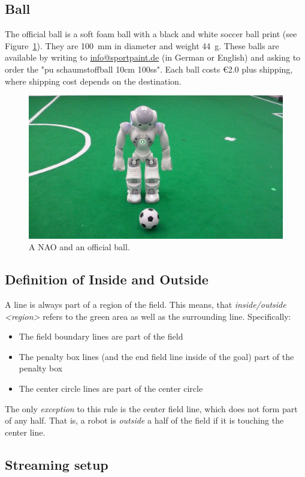 \subsection{Ball}
\label{sec:ball}

The official ball is a soft foam ball with a black and white soccer ball print (see Figure~\ref{fig:ball}). They are \qty{100}{\milli\metre} in diameter and weight \qty{44}{\gram}. These balls are available by writing to \url{info@sportpaint.de} (in German or English) and asking to order the "pu schaumstoffball 10cm 100ss".  Each ball costs \euro{2.0} plus shipping, where shipping cost depends on the destination.

\begin{figure}[t]
  \centerline{\includegraphics[height=0.28\columnwidth]{figs/robotWithBall2016.jpg}}
  \caption{A NAO and an official ball.}
  \label{fig:ball}
\end{figure}

\subsection{Definition of Inside and Outside}
\label{sec:inside_outside}

A line is always part of a region of the field.
This means, that \emph{inside/outside \textless region\textgreater} refers to the green area as well as the surrounding line.
Specifically:
\begin{itemize}
    \item The field boundary lines are part of the field
    \item The penalty box lines (and the end field line inside of the goal) part of the penalty box
    \item The center circle lines are part of the center circle
\end{itemize}

The only \textit{exception} to this rule is the center field line, which does not form part of any half.
That is, a robot is \textit{outside} a half of the field if it is touching the center line.

\subsection{Streaming setup}
\label{sec:streaming_setup}

